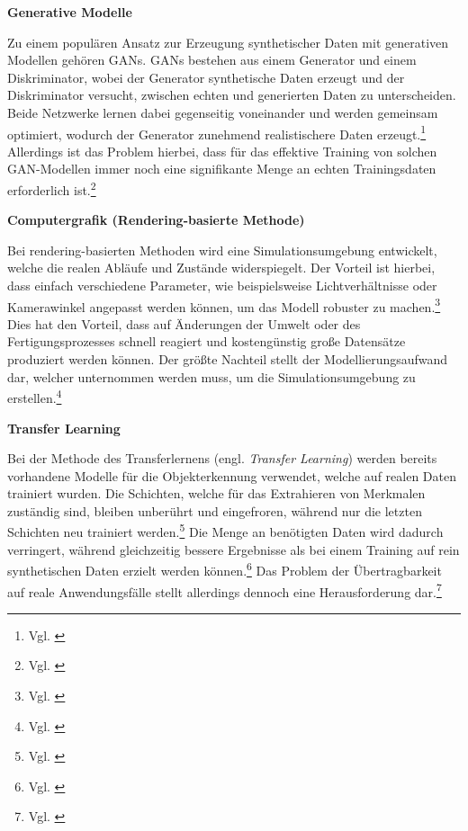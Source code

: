 \textbf{Generative Modelle}

Zu einem populären Ansatz zur Erzeugung synthetischer Daten mit generativen Modellen gehören \acp{GAN}. \acp{GAN} bestehen aus einem Generator und einem Diskriminator, wobei der Generator synthetische Daten erzeugt und der Diskriminator versucht, zwischen echten und generierten Daten zu unterscheiden. Beide Netzwerke lernen dabei gegenseitig voneinander und werden gemeinsam optimiert, wodurch der Generator zunehmend realistischere Daten erzeugt.\footnote{Vgl. \cite[S. 1010]{jain_synthetic_2022}}
Allerdings ist das Problem hierbei, dass für das effektive Training von solchen \ac{GAN}-Modellen immer noch eine signifikante Menge an echten Trainingsdaten erforderlich ist.\footnote{Vgl. \cite[S. 768]{monnet_investigating_2024}} 

\textbf{Computergrafik (Rendering-basierte Methode)}

Bei rendering-basierten Methoden wird eine Simulationsumgebung entwickelt, welche die realen Abläufe und Zustände widerspiegelt. 
Der Vorteil ist hierbei, dass einfach verschiedene Parameter, wie beispielsweise Lichtverhältnisse oder Kamerawinkel angepasst werden können, um das Modell robuster zu machen.\footnote{Vgl. \cite[S. 239]{manettas_synthetic_2021}} Dies hat den Vorteil, dass auf Änderungen der Umwelt oder des Fertigungsprozesses schnell reagiert und kostengünstig große Datensätze produziert werden können. Der größte Nachteil stellt der Modellierungsaufwand dar, welcher unternommen werden muss, um die Simulationsumgebung zu erstellen.\footnote{Vgl. \cite[S. 769]{monnet_investigating_2024}}

\textbf{Transfer Learning}

Bei der Methode des Transferlernens (engl. \textit{Transfer Learning}) werden bereits vorhandene Modelle für die Objekterkennung verwendet, welche auf realen Daten trainiert wurden. Die Schichten, welche für das Extrahieren von Merkmalen zuständig sind, bleiben unberührt und eingefroren, während nur die letzten Schichten neu trainiert werden.\footnote{Vgl. \cite[S. 250]{urgo_monitoring_2024}} Die Menge an benötigten Daten wird dadurch verringert, während gleichzeitig bessere Ergebnisse als bei einem Training auf rein synthetischen Daten erzielt werden können.\footnote{Vgl. \cite[S. 251]{urgo_monitoring_2024}} Das Problem der Übertragbarkeit auf reale Anwendungsfälle stellt allerdings dennoch eine Herausforderung dar.\footnote{Vgl. \cite[S. 251]{urgo_monitoring_2024}}



